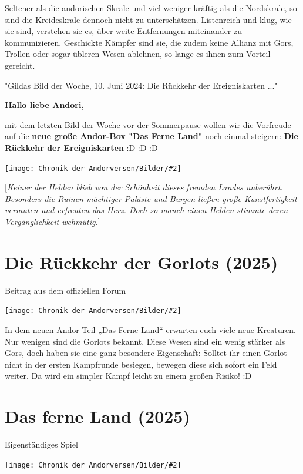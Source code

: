 \documentclass[10pt, a4paper, oneside]{book}
\newcommand{\fillbreak}{\vspace*{\fill}\columnbreak}
\newcommand{\produkt}[1]{%
    \section{#1}%
    \label{Produkt: #1}%
}
\newcommand{\storytext}[1]{%
    \section{#1}%
    \label{Storytext: #1}%
}
\newcommand{\bildmitts}[2][height=0.32\textwidth,width=0.48\textwidth,keepaspectratio]{%
    \begin{center}
        \texttt{[image: Chronik der Andorversen/Bilder/\#2]}
    \end{center}
}
\begin{document}
\begin{multicols}{2}
Seltener als die andorischen Skrale und viel weniger kräftig als die Nordskrale, so sind die Kreideskrale dennoch nicht zu unterschätzen. Listenreich und klug, wie sie sind, verstehen sie es, über weite Entfernungen miteinander zu kommunizieren. Geschickte Kämpfer sind sie, die zudem keine Allianz mit Gors, Trollen oder sogar übleren Wesen ablehnen, so lange es ihnen zum Vorteil gereicht.



\begin{center}
    "Gildas Bild der Woche, 10. Juni 2024: Die Rückkehr der Ereigniskarten ..."
\end{center}

\textbf{Hallo liebe Andori,}

mit dem letzten Bild der Woche vor der Sommerpause wollen wir die Vorfreude auf die \textbf{neue große Andor-Box "Das Ferne Land"} noch einmal steigern: \textbf{Die Rückkehr der Ereigniskarten} :D :D :D

\bildmitts{2025! 4.jpeg}

[\textit{Keiner der Helden blieb von der Schönheit dieses fremden Landes unberührt. Besonders die Ruinen mächtiger Paläste und Burgen ließen große Kunstfertigkeit vermuten und erfreuten das Herz. Doch so manch einen Helden stimmte deren Vergänglichkeit wehmütig.}]




\fillbreak
\storytext{Die Rückkehr der Gorlots (2025)}

\begin{center}
    Beitrag aus dem offiziellen Forum
\end{center}

\bildmitts{Die Rückkehr der Gorlots (2025).jpeg}

In dem neuen Andor-Teil „Das Ferne Land“ erwarten euch viele neue Kreaturen. Nur wenigen sind die Gorlots bekannt. Diese Wesen sind ein wenig stärker als Gors, doch haben sie eine ganz besondere Eigenschaft: Solltet ihr einen Gorlot nicht in der ersten Kampfrunde besiegen, bewegen diese sich sofort ein Feld weiter. Da wird ein simpler Kampf leicht zu einem großen Risiko! :D





\fillbreak
\produkt{Das ferne Land (2025)}

\begin{center}
    Eigenständiges Spiel
\end{center}

\bildmitts{Das ferne Land (2025).png}


\end{multicols}
\end{document}
